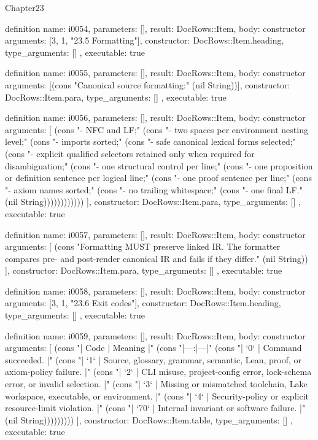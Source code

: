\begin{lexlean}{Chapter23}
\begin{semanticmodule}
definition{
  name: i0054,
  parameters: [],
  result: DocRows::Item,
  body: constructor{
    arguments: [3, 1, "23.5 Formatting"],
    constructor: DocRows::Item.heading,
    type_arguments: []
  },
  executable: true
}

definition{
  name: i0055,
  parameters: [],
  result: DocRows::Item,
  body: constructor{
    arguments: [(cons "Canonical source formatting:" (nil String))],
    constructor: DocRows::Item.para,
    type_arguments: []
  },
  executable: true
}

definition{
  name: i0056,
  parameters: [],
  result: DocRows::Item,
  body: constructor{
    arguments: [
      (cons "- NFC and LF;" (cons "- two spaces per environment nesting level;" (cons "- imports sorted;" (cons "- safe canonical lexical forms selected;" (cons "- explicit qualified selectors retained only when required for disambiguation;" (cons "- one structural control per line;" (cons "- one proposition or definition sentence per logical line;" (cons "- one proof sentence per line;" (cons "- axiom names sorted;" (cons "- no trailing whitespace;" (cons "- one final LF." (nil String))))))))))))
    ],
    constructor: DocRows::Item.para,
    type_arguments: []
  },
  executable: true
}

definition{
  name: i0057,
  parameters: [],
  result: DocRows::Item,
  body: constructor{
    arguments: [
      (cons "Formatting MUST preserve linked IR. The formatter compares pre- and post-render canonical IR and fails if they differ." (nil String))
    ],
    constructor: DocRows::Item.para,
    type_arguments: []
  },
  executable: true
}

definition{
  name: i0058,
  parameters: [],
  result: DocRows::Item,
  body: constructor{
    arguments: [3, 1, "23.6 Exit codes"],
    constructor: DocRows::Item.heading,
    type_arguments: []
  },
  executable: true
}

definition{
  name: i0059,
  parameters: [],
  result: DocRows::Item,
  body: constructor{
    arguments: [
      (cons "| Code | Meaning |" (cons "|---:|---|" (cons "| `0` | Command succeeded. |" (cons "| `1` | Source, glossary, grammar, semantic, Lean, proof, or axiom-policy failure. |" (cons "| `2` | CLI misuse, project-config error, lock-schema error, or invalid selection. |" (cons "| `3` | Missing or mismatched toolchain, Lake workspace, executable, or environment. |" (cons "| `4` | Security-policy or explicit resource-limit violation. |" (cons "| `70` | Internal invariant or software failure. |" (nil String)))))))))
    ],
    constructor: DocRows::Item.table,
    type_arguments: []
  },
  executable: true
}


\end{semanticmodule}
\end{lexlean}
